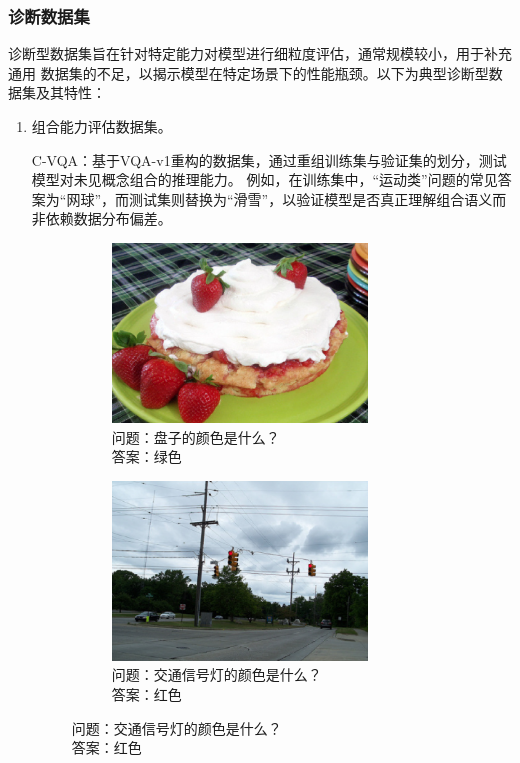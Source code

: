 \subsubsection{诊断数据集}
诊断型数据集旨在针对特定能力对模型进行细粒度评估，通常规模较小，用于补充通用
数据集的不足，以揭示模型在特定场景下的性能瓶颈。以下为典型诊断型数据集及其特性：
\begin{enumerate}[nosep]
    \item 组合能力评估数据集。

​C-VQA\cite{agrawal2017c}：基于VQA-v1重构的数据集，通过重组训练集与验证集的划分，测试模型对未见概念组合的推理能力。
例如，在训练集中，“运动类”问题的常见答案为“网球”，而测试集则替换为“滑雪”，以验证模型是否真正理解组合语义而非依赖数据分布偏差。

\begin{figure}[h]
    \centering
    
    \begin{subfigure}[b]{0.45\textwidth}
        \centering
        \includegraphics[width=0.8\textwidth]{figures/CVQA-A.png}
        \caption*{问题：盘子的颜色是什么？\\答案：绿色}
    \end{subfigure}
    \hfill
    \begin{subfigure}[b]{0.45\textwidth}
        \centering
        \includegraphics[width=0.8\textwidth]{figures/CVQA-B.png}
        \caption*{问题：交通信号灯的颜色是什么？\\答案：红色}
    \end{subfigure}


\end{figure}
\end{enumerate}

